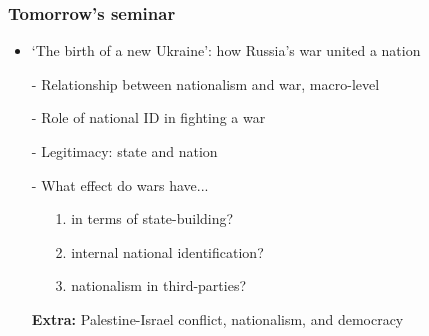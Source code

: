\documentclass[aspectratio=43, handout]{beamer}
\begin{document}
\begin{frame}
\frametitle{Tomorrow's seminar}
\centering

\begin{itemize}
  \item `The birth of a new Ukraine': how Russia's war united a nation
  \item[]
  \item[-] Relationship between nationalism and war, macro-level
  \item[-] Role of national ID in fighting a war
  \item[-] Legitimacy: state and nation
  \item[-] What effect do wars have...
  \begin{itemize}
    \item[1.] in terms of state-building?
    \item[2.] internal national identification?
    \item[3.] nationalism in third-parties?
  \end{itemize}
  \item[] \textbf{Extra:} Palestine-Israel conflict, nationalism, and democracy 
\end{itemize}

\end{frame}
\end{document}
